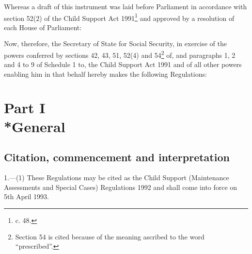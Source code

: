 \documentclass[12pt,a4paper]{article}
\title{\regstitle}
\author{S.I. 1992 No. 1815}
\date{Made 20th July 1992\\Coming into force 5th April 1993}
\begin{document}
\maketitle

\noindent
 Whereas a draft of this instrument was laid before Parliament in accordance with section 52(2) of the Child Support Act 1991\footnote{ c. 48.} and approved by a resolution of each House of Parliament:

Now, therefore, the Secretary of State for Social Security, in exercise of the powers conferred by sections 42, 43, 51, 52(4) and 54\footnote{\frenchspacing Section 54 is cited because of the meaning ascribed to the word “prescribed”.} of, and paragraphs 1, 2 and 4 to 9 of Schedule 1 to, the Child Support Act 1991 and of all other powers enabling him in that behalf hereby makes the following Regulations: 

{\sloppy

\tableofcontents

}

\setcounter{secnumdepth}{-2}

\section[Part I --- General]{Part I\\*General}

\renewcommand\parthead{--- Part I}

\subsection[1. Citation, commencement and interpretation]{Citation, commencement and interpretation}

1.—(1) These Regulations may be cited as the Child Support (Maintenance Assessments and Special Cases) Regulations 1992 and shall come into force on 5th April 1993.
\end{document}
